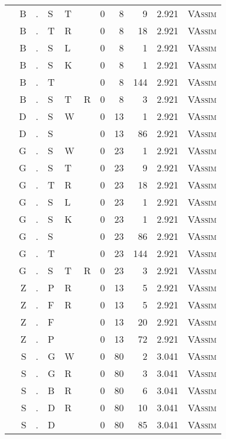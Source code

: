 \begin{longtable}{r@{ } r@{ } c@{ } l@{ } l@{ } l@{ } r r r r l }
  & B & . & S & T &   & 0 & 8 & 9 & 2.921 & \textsc{VAssim} \\
  & B & . & T & R &   & 0 & 8 & 18 & 2.921 & \textsc{VAssim} \\
  & B & . & S & L &   & 0 & 8 & 1 & 2.921 & \textsc{VAssim} \\
  & B & . & S & K &   & 0 & 8 & 1 & 2.921 & \textsc{VAssim} \\
  & B & . & T &   &   & 0 & 8 & 144 & 2.921 & \textsc{VAssim} \\
  & B & . & S & T & R & 0 & 8 & 3 & 2.921 & \textsc{VAssim} \\
  & D & . & S & W &   & 0 & 13 & 1 & 2.921 & \textsc{VAssim} \\
  & D & . & S &   &   & 0 & 13 & 86 & 2.921 & \textsc{VAssim} \\
  & G & . & S & W &   & 0 & 23 & 1 & 2.921 & \textsc{VAssim} \\
  & G & . & S & T &   & 0 & 23 & 9 & 2.921 & \textsc{VAssim} \\
  & G & . & T & R &   & 0 & 23 & 18 & 2.921 & \textsc{VAssim} \\
  & G & . & S & L &   & 0 & 23 & 1 & 2.921 & \textsc{VAssim} \\
  & G & . & S & K &   & 0 & 23 & 1 & 2.921 & \textsc{VAssim} \\
  & G & . & S &   &   & 0 & 23 & 86 & 2.921 & \textsc{VAssim} \\
  & G & . & T &   &   & 0 & 23 & 144 & 2.921 & \textsc{VAssim} \\
  & G & . & S & T & R & 0 & 23 & 3 & 2.921 & \textsc{VAssim} \\
  & Z & . & P & R &   & 0 & 13 & 5 & 2.921 & \textsc{VAssim} \\
  & Z & . & F & R &   & 0 & 13 & 5 & 2.921 & \textsc{VAssim} \\
  & Z & . & F &   &   & 0 & 13 & 20 & 2.921 & \textsc{VAssim} \\
  & Z & . & P &   &   & 0 & 13 & 72 & 2.921 & \textsc{VAssim} \\
  & S & . & G & W &   & 0 & 80 & 2 & 3.041 & \textsc{VAssim} \\
  & S & . & G & R &   & 0 & 80 & 3 & 3.041 & \textsc{VAssim} \\
  & S & . & B & R &   & 0 & 80 & 6 & 3.041 & \textsc{VAssim} \\
  & S & . & D & R &   & 0 & 80 & 10 & 3.041 & \textsc{VAssim} \\
  & S & . & D &   &   & 0 & 80 & 85 & 3.041 & \textsc{VAssim} \\

\end{longtable}
